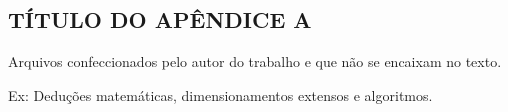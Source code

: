\begin{apendicesenv}

\chapter{TÍTULO DO APÊNDICE A}

Arquivos confeccionados pelo autor do trabalho e que não se encaixam no texto.

 Ex: Deduções matemáticas, dimensionamentos extensos e algoritmos.

\end{apendicesenv}